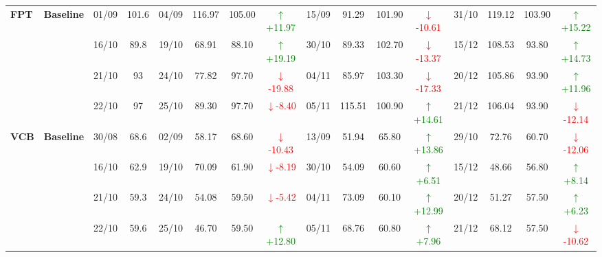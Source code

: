 \documentclass{ieeeaccess}
\begin{document}
{\begin{longtable}{llcc|cccc|cccc|cccc}
\multirow{4}{*}{\textbf{FPT}}
& \textbf{Baseline}
& 01/09 & 101.6 & 04/09 & 116.97 & 105.00 & \textcolor{green}{\(\uparrow\)+11.97} & 15/09 & 91.29 & 101.90 & \textcolor{red}{\(\downarrow\)-10.61} & 31/10 & 119.12 & 103.90 & \textcolor{green}{\(\uparrow\)+15.22} \\
& & 16/10 & 89.8 & 19/10 & 68.91 & 88.10 & \textcolor{green}{\(\uparrow\)+19.19} & 30/10 & 89.33 & 102.70 & \textcolor{red}{\(\downarrow\)-13.37} & 15/12 & 108.53 & 93.80 & \textcolor{green}{\(\uparrow\)+14.73} \\
& & 21/10 & 93 & 24/10 & 77.82 & 97.70 & \textcolor{red}{\(\downarrow\)-19.88} & 04/11 & 85.97 & 103.30 & \textcolor{red}{\(\downarrow\)-17.33} & 20/12 & 105.86 & 93.90 & \textcolor{green}{\(\uparrow\)+11.96} \\
& & 22/10 & 97 & 25/10 & 89.30 & 97.70 & \textcolor{red}{\(\downarrow\)-8.40} & 05/11 & 115.51 & 100.90 & \textcolor{green}{\(\uparrow\)+14.61} & 21/12 & 106.04 & 93.90 & \textcolor{red}{\(\downarrow\)-12.14} \\
\midrule

\multirow{4}{*}{\textbf{VCB}}
& \textbf{Baseline}
& 30/08 & 68.6 & 02/09 & 58.17 & 68.60 & \textcolor{red}{\(\downarrow\)-10.43} & 13/09 & 51.94 & 65.80 & \textcolor{green}{\(\uparrow\)+13.86} & 29/10 & 72.76 & 60.70 & \textcolor{red}{\(\downarrow\)-12.06} \\
& & 16/10 & 62.9 & 19/10 & 70.09 & 61.90 & \textcolor{red}{\(\downarrow\)-8.19} & 30/10 & 54.09 & 60.60 & \textcolor{green}{\(\uparrow\)+6.51} & 15/12 & 48.66 & 56.80 & \textcolor{green}{\(\uparrow\)+8.14} \\
& & 21/10 & 59.3 & 24/10 & 54.08 & 59.50 & \textcolor{red}{\(\downarrow\)-5.42} & 04/11 & 73.09 & 60.10 & \textcolor{green}{\(\uparrow\)+12.99} & 20/12 & 51.27 & 57.50 & \textcolor{green}{\(\uparrow\)+6.23} \\
& & 22/10 & 59.6 & 25/10 & 46.70 & 59.50 & \textcolor{green}{\(\uparrow\)+12.80} & 05/11 & 68.76 & 60.80 & \textcolor{green}{\(\uparrow\)+7.96} & 21/12 & 68.12 & 57.50 & \textcolor{red}{\(\downarrow\)-10.62} \\
\midrule


\end{longtable}}
\end{document}
